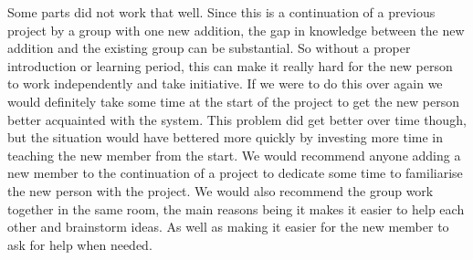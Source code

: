 Some parts did not work that well. Since this is a continuation of a previous project by a group with one new addition, the gap in knowledge between the new addition and the existing group can be substantial. So without a proper introduction or learning period, this can make it really hard for the new person to work independently and take initiative. If we were to do this over again we would definitely take some time at the start of the project to get the new person better acquainted with the system. This problem did get better over time though, but the situation would have bettered more quickly by investing more time in teaching the new member from the start. We would recommend anyone adding a new member to the continuation of a project to dedicate some time to familiarise the new person with the project. We would also recommend the group work together in the same room, the main reasons being it makes it easier to help each other and brainstorm ideas. As well as making it easier for the new member to ask for help when needed.

